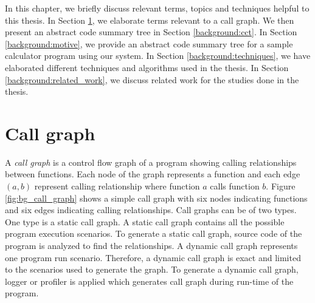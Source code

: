 
\label{chapter:background}

In this chapter, we briefly discuss relevant terms, topics and techniques helpful to this thesis. In Section \ref{background:call_graph}, we elaborate terms relevant to a call graph. We then present an  abstract code summary tree in Section \ref{background:cct}. In Section \ref{background:motive}, we provide an abstract code summary tree for a sample calculator program using our system. In Section \ref{background:techniques}, we have elaborated different techniques and algorithms used in the thesis. In Section \ref{background:related_work}, we discuss related work for the studies done in the thesis.  

\section{Call graph}
\label{background:call_graph}
A \emph{call graph} is a control flow graph of a program showing calling relationships between functions. Each node of the graph represents a function and each edge $(a, b)$ represent calling relationship where function $a$ calls function $b$. Figure \ref{fig:bg_call_graph} shows a simple call graph with six nodes indicating functions and six edges indicating calling relationships. Call graphs can be of two types. One type is a static call graph. A static call graph contains all the possible program execution scenarios. To generate a static call graph, source code of the program is analyzed to find the relationships. A dynamic call graph represents one program run scenario. Therefore, a dynamic call graph is exact and limited to the scenarios used to generate the graph. To generate a dynamic call graph, logger or profiler is applied which generates call graph during run-time of the program.

